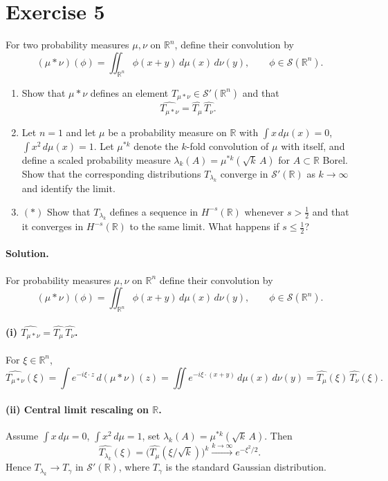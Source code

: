 \documentclass[12pt,a4paper]{article}
\theoremstyle{plain}
\theoremstyle{definition}
\theoremstyle{remark}
\theoremstyle{remark}
\begin{document}
\bigskip

\section*{Exercise 5}


For two probability measures $\mu,\nu$ on $\mathbb R^n$, define their convolution by
\[
(\mu*\nu)(\phi)=\iint_{\mathbb R^n}\phi(x+y)\,d\mu(x)\,d\nu(y),\qquad \phi\in\mathcal S(\mathbb R^n).
\]

\begin{enumerate}[label=(\roman*)]
	\item Show that $\mu*\nu$ defines an element $T_{\mu*\nu}\in\mathcal S'(\mathbb R^n)$ and that
	\[
	\widehat{T_{\mu*\nu}}=\widehat{T_\mu}\,\widehat{T_\nu}.
	\]
	\item Let $n=1$ and let $\mu$ be a probability measure on $\mathbb R$ with
	$\int x\,d\mu(x)=0$, $\int x^2\,d\mu(x)=1$.
	Let $\mu^{*k}$ denote the $k$-fold convolution of $\mu$ with itself, and define a scaled probability measure
	$\lambda_k(A)=\mu^{*k}(\sqrt{k}\,A)$ for $A\subset\mathbb R$ Borel.
	Show that the corresponding distributions $T_{\lambda_k}$ converge in $\mathcal S'(\mathbb R)$ as $k\to\infty$
	and identify the limit.
	\item $(*)$ Show that $T_{\lambda_k}$ defines a sequence in $H^{-s}(\mathbb R)$ whenever $s>\tfrac12$
	and that it converges in $H^{-s}(\mathbb R)$ to the same limit.
	What happens if $s\le\tfrac12$?
\end{enumerate}

\paragraph{Solution.}

\bigskip


For probability measures $\mu,\nu$ on $\mathbb R^n$ define their convolution by
\[
(\mu*\nu)(\phi)=\iint_{\mathbb R^n}\phi(x+y)\,d\mu(x)\,d\nu(y),\qquad \phi\in\mathcal S(\mathbb R^n).
\]

\paragraph{(i) $\widehat{T_{\mu*\nu}}=\widehat{T_\mu}\,\widehat{T_\nu}$.}
For $\xi\in\mathbb R^n$,
\[
\widehat{T_{\mu*\nu}}(\xi)
=\int e^{-i\xi\cdot z}\,d(\mu*\nu)(z)
=\iint e^{-i\xi\cdot(x+y)}\,d\mu(x)\,d\nu(y)
=\widehat{T_\mu}(\xi)\,\widehat{T_\nu}(\xi).
\]

\paragraph{(ii) Central limit rescaling on $\mathbb R$.}
Assume $\int x\,d\mu=0$, $\int x^2\,d\mu=1$, set $\lambda_k(A)=\mu^{*k}(\sqrt{k}\,A)$.
Then
\[
\widehat{T_{\lambda_k}}(\xi)=\big(\widehat{T_\mu}(\xi/\sqrt{k})\big)^k \xrightarrow{k\to\infty} e^{-\xi^2/2}.
\]
Hence $T_{\lambda_k}\to T_\gamma$ in $\mathcal S'(\mathbb R)$, where $T_\gamma$ is the standard Gaussian distribution.
\end{document}
